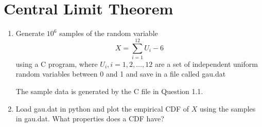 \documentclass[journal,12pt,twocolumn]{IEEEtran}
\renewcommand\thesection{\arabic{section}}
\begin{document}
\section{Central Limit Theorem}
%
\begin{enumerate}[label=\thesection.\arabic*
,ref=\thesection.\theenumi]

%
\item
Generate $10^6$ samples of the random variable
%
\begin{equation}
X = \sum_{i=1}^{12}U_i -6
\end{equation}
%
using a C program, where $U_i, i = 1,2,\dots, 12$ are  a set of independent uniform random variables between 0 and 1
and save in a file called gau.dat

\solution
The sample data is generated by the C file in Question 1.1.
%
\item
Load gau.dat in python and plot the empirical CDF of $X$ using the samples in gau.dat. What properties does a CDF have?


\end{enumerate}
\end{document}
